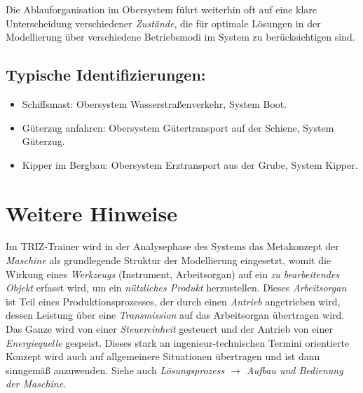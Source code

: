 \documentclass[11pt,a4paper]{article}
\begin{document}
Die Ablauforganisation im Obersystem führt weiterhin oft auf eine klare
Unterscheidung verschiedener \emph{Zustände}, die für optimale Lösungen in der
Modellierung über verschiedene Betriebsmodi im System zu berücksichtigen sind.

\subsection*{Typische Identifizierungen:}
\begin{itemize}
\item Schiffsmast: Obersystem Wasserstraßenverkehr, System Boot.
\item Güterzug anfahren: Obersystem Gütertransport auf der Schiene, System
  Güterzug. 
\item Kipper im Bergbau: Obersystem Erztransport aus der Grube, System
  Kipper. 
\end{itemize}

\section{Weitere Hinweise}

Im TRIZ-Trainer wird in der Analysephase des Systems das Metakonzept der
\emph{Maschine} als grundlegende Struktur der Modellierung eingesetzt, womit
die Wirkung eines \emph{Werkzeugs} (Instrument, Arbeitsorgan) auf ein \emph{zu
  bearbeitendes Objekt} erfasst wird, um ein \emph{nützliches Produkt}
herzustellen.  Dieses \emph{Arbeitsorgan} ist Teil eines Produktionsprozesses,
der durch einen \emph{Antrieb} angetrieben wird, dessen Leistung über eine
\emph{Transmission} auf das Arbeitsorgan übertragen wird.  Das Ganze wird von
einer \emph{Steuereinheit} gesteuert und der Antrieb von einer
\emph{Energiequelle} gespeist.  Dieses stark an ingenieur-technischen Termini
orientierte Konzept wird auch auf allgemeinere Situationen übertragen und ist
dann sinngemäß anzuwenden.  Siehe auch \emph{Lösungsprozess $\to$ Aufbau und
  Bedienung der Maschine}.
\end{document}
